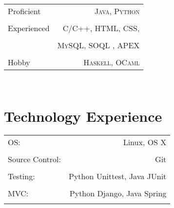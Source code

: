 \documentclass[10pt]{article} %
\begin{document}
\begin{minipage}[t]{0.44\textwidth}
\begin{tabular}{l r}
Proficient
& \textsc{Java}, \textsc{Python} \\  \hfill \\
Experienced
& \textsc{C/C++}, \textsc{HTML}, \textsc{CSS}, \\ \hfill \\
& \textsc{MySQL, SOQL} , \textsc{APEX}\\ \hfill \\
Hobby
& \textsc{Haskell}, \textsc{OCaml} \hfill
\end{tabular}\\

\section{\color{section} \sffamily Technology Experience}
\begin{tabular}{lr}
OS: & Linux, OS X \\ \hfill \\
Source Control: & Git \\ \hfill \\
Testing: & Python Unittest, Java JUnit \\ \hfill \\
MVC: & Python Django, Java Spring \\ \hfill \\
\end{tabular}

\end{minipage} %
\end{document}
